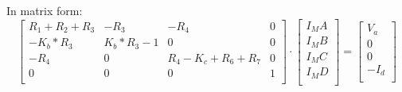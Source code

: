 In matrix form:
  \begin{equation}\label{eq:matrixeqn}
\begin{bmatrix}
R_1+R_2+R_3 & -R_3 & -R_4 & 0 \\

-K_b*R_3 & K_b* R_3-1 & 0 & 0 \\

-R_4 & 0 & R_4-K_c+R_6+R_7 & 0 \\

0 & 0 & 0 & 1 \\
\end{bmatrix}


    \cdot
    \begin{bmatrix}
      I_MA \\
      I_MB \\
      I_MC \\
      I_MD \\
    \end{bmatrix}
    =
    \begin{bmatrix}
      V_a \\
      0 \\
      0 \\
      -I_d\\
    \end{bmatrix}
  \end{equation}





